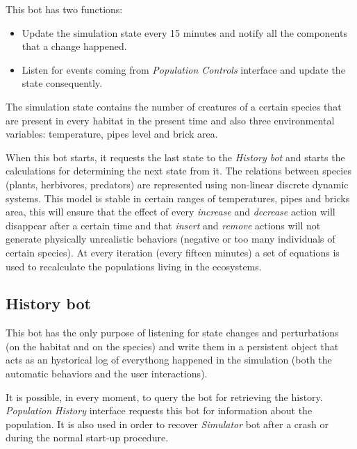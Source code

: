 This bot has two functions:
\begin{itemize}
\item Update the simulation state every 15 minutes and notify all the components that a change happened.
\item Listen for events coming from \textit{Population Controls} interface and update the state consequently.
\end{itemize}

The simulation state contains the number of creatures of a certain species that are present in every habitat in the present time and also three environmental variables: temperature, pipes level and brick area.

When this bot starts, it requests the last state to the \textit{History bot} and starts the calculations for determining the next state from it. The relations between species (plants, herbivores, predators) are represented using non-linear discrete dynamic systems. This model is stable in certain ranges of temperatures, pipes and bricks area, this will ensure that the effect of every \textit{increase} and \textit{decrease} action will disappear after a certain time and that \textit{insert} and \textit{remove} actions will not generate physically unrealistic behaviors (negative or too many individuals of certain species). At every iteration (every fifteen minutes) a set of equations is used to recalculate the populations living in the ecosystems.

\subsection{History bot}
This bot has the only purpose of listening for state changes and perturbations (on the habitat and on the species) and write them in a persistent object that acts as an hystorical log of everythong happened in the simulation (both the automatic behaviors and the user interactions).

It is possible, in every moment, to query the bot for retrieving the history. \textit{Population History} interface requests this bot for information about the population. It is also used in order to recover \textit{Simulator} bot after a crash or during the normal start-up procedure.

